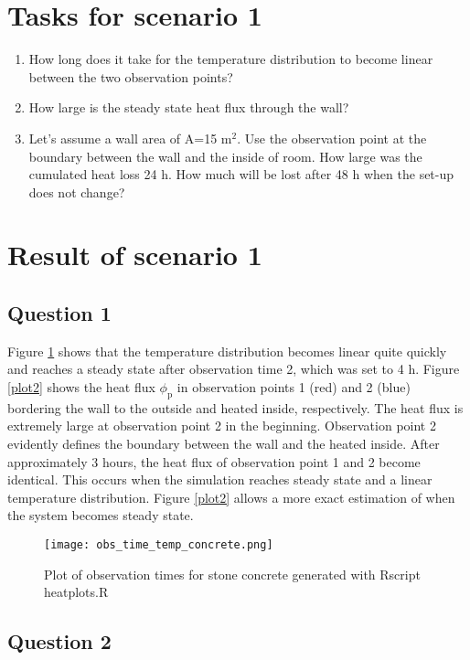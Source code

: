 \documentclass[
10pt, %
a4paper, %
oneside, %
headinclude,footinclude, %
BCOR5mm, %
]{scrartcl}
\begin{document}
\section*{Tasks for scenario 1}

\begin{enumerate}
\item How long does it take for the temperature distribution to become linear between the two observation points?
\item How large is the steady state heat flux through the wall?
\item Let's assume a wall area of A=15 m$^2$. Use the observation point at the boundary between the wall and the inside of room. How large was the cumulated heat loss 24 h. How much will be lost after 48 h when the set-up does not change?
\end{enumerate}


\section*{Result of scenario 1}

\subsection*{Question 1}
Figure \ref{plot1} shows that the temperature distribution becomes linear quite quickly and reaches a steady state after observation time 2, which was set to 4 h. Figure \ref{plot2} shows the heat flux $\phi_{\mathrm{p}}$ in observation points 1 (red) and 2 (blue) bordering the wall to the outside and heated inside, respectively.  The heat flux is extremely large at observation point 2 in the beginning. Observation point 2 evidently defines the boundary between the wall and the heated inside. After approximately 3 hours, the heat flux of observation point 1 and 2 become identical. This occurs when the simulation reaches steady state and a linear temperature distribution. Figure \ref{plot2} allows a more exact estimation of when the system becomes steady state. 

\begin{figure}[!h]
\centering
\texttt{[image: obs\_time\_temp\_concrete.png]}
\caption{\label{plot1}Plot of observation times for stone concrete generated with Rscript heatplots.R}
\end{figure}

\subsection*{Question 2}
\end{document}
